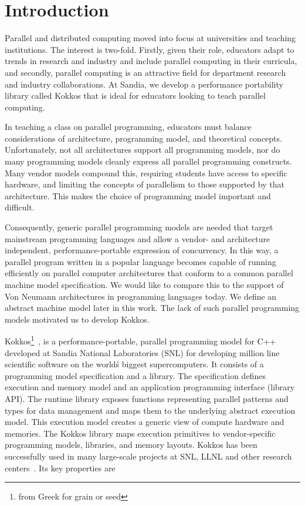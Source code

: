 
\section{Introduction}\label{chap:introduction}

Parallel and distributed computing moved into focus at universities and teaching institutions. The interest is two-fold. Firstly, given their role, educators adapt to trends in research and industry and include parallel computing in their curricula, and secondly, parallel computing is an attractive field for department research and industry collaborations. At Sandia, we develop a performance portability library called Kokkos that is ideal for educators looking to teach parallel computing.

In teaching a class on parallel programming, educators must balance considerations of architecture, programming model, and theoretical concepts. Unfortunately, not all architectures support all programming models, nor do many programming models cleanly express all parallel programming constructs. Many vendor models compound this, requiring students have access to specific hardware, and limiting the concepts of parallelism to those supported by that architecture. This makes the choice of programming model important and difficult.

Consequently, generic parallel programming models are needed that target mainstream programming languages and allow a vendor- and architecture independent, performance-portable expression of concurrency. In this way, a parallel program written in a popular language becomes capable of running efficiently on parallel computer architectures that conform to a common parallel machine model specification. We would like to compare this to the support of Von Neumann architectures in programming languages today. We define an abstract machine model later in this work. The lack of such parallel programming models motivated us to develop Kokkos.

Kokkos\footnote{from Greek for grain or seed}~\cite{KOKKOS_PAPER_HERE}, is a performance-portable, parallel programming model for C++ developed at Sandia National Laboratories (SNL) for developing million line scientific software on the world\'s biggest supercomputers. It consists of a programming model specification and a library. The specification defines execution and memory model and an application programming interface (library API). The runtime library exposes functions representing parallel patterns and types for data management and maps them to the underlying abstract execution model. This execution model creates a generic view of compute hardware and memories. The Kokkos library maps execution primitives to vendor-specific programming models, libraries, and memory layouts. Kokkos has been successfully used in many large-scale projects at SNL, LLNL and other research centers~\cite{CITEKOKKOSUSECASES}. Its key properties are


